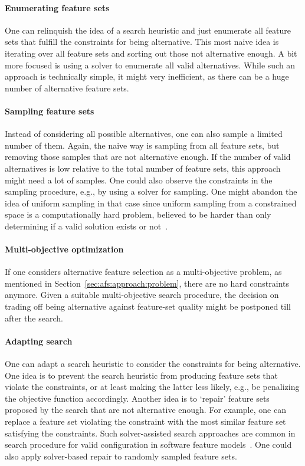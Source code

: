 \documentclass{article}
\theoremstyle{definition}
\begin{document}
\paragraph{Enumerating feature sets}

One can relinquish the idea of a search heuristic and just enumerate all feature sets that fulfill the constraints for being alternative.
This most naive idea is iterating over all feature sets and sorting out those not alternative enough.
A bit more focused is using a solver to enumerate all valid alternatives.
While such an approach is technically simple, it might very inefficient, as there can be a huge number of alternative feature sets.

\paragraph{Sampling feature sets}

Instead of considering all possible alternatives, one can also sample a limited number of them.
Again, the naive way is sampling from all feature sets, but removing those samples that are not alternative enough.
If the number of valid alternatives is low relative to the total number of feature sets, this approach might need a lot of samples.
One could also observe the constraints in the sampling procedure, e.g., by using a solver for sampling.
One might abandon the idea of uniform sampling in that case since uniform sampling from a constrained space is a computationally hard problem, believed to be harder than only determining if a valid solution exists or not~\cite{ermon2012uniform}.

\paragraph{Multi-objective optimization}

If one considers alternative feature selection as a multi-objective problem, as mentioned in Section~\ref{sec:afs:approach:problem}, there are no hard constraints anymore.
Given a suitable multi-objective search procedure, the decision on trading off being alternative against feature-set quality might be postponed till after the search.

\paragraph{Adapting search}

One can adapt a search heuristic to consider the constraints for being alternative.
One idea is to prevent the search heuristic from producing feature sets that violate the constraints, or at least making the latter less likely, e.g., be penalizing the objective function accordingly.
Another idea is to `repair' feature sets proposed by the search that are not alternative enough.
For example, one can replace a feature set violating the constraint with the most similar feature set satisfying the constraints.
Such solver-assisted search approaches are common in search procedure for valid configuration in software feature models~\cite{guo2018preserve, henard2015combining, white2010automated}.
One could also apply solver-based repair to randomly sampled feature sets.
\end{document}
